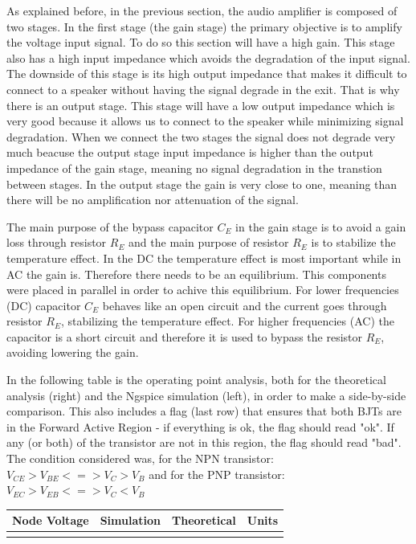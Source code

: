 As explained before, in the previous section, the audio amplifier is composed of two stages. In the first stage (the gain stage) the primary objective is to amplify the voltage input signal. To do so this section will have a high gain. This stage also has a high input impedance which avoids the degradation of the input signal. The  downside of this stage is its high output impedance that makes it difficult to connect to a speaker without having the signal degrade in the exit. That is why there is an output stage. This stage will have a low output impedance which is very good because it allows us to connect to the speaker while minimizing signal degradation. When we connect the two stages the signal does not degrade very much beacuse the output stage input impedance is higher than the output impedance of the gain stage, meaning no signal degradation in the transtion between stages. In the output stage the gain is very close to one, meaning than there will be no amplification nor attenuation of the signal.   

The main purpose of the bypass capacitor $C_{E}$ in the gain stage is to avoid a gain loss through resistor ${R_E}$ and the main purpose of resistor ${R_E}$ is to stabilize the temperature effect. In the DC the temperature effect is most important while in AC the gain is. Therefore there needs to be an equilibrium. This components were placed in parallel in order to achive this equilibrium. For lower frequencies (DC) capacitor $C_{E}$ behaves like an open circuit and the current goes through resistor ${R_E}$, stabilizing the temperature effect. For higher frequencies (AC) the capacitor is a short circuit and therefore it is used to bypass the resistor $R_{E}$, avoiding lowering the gain. 

In the following table is the operating point analysis, both for the theoretical analysis (right) and the Ngspice simulation (left), in order to make a side-by-side comparison. This also includes a flag (last row) that ensures that both BJTs are in the Forward Active Region - if everything is ok, the flag should read "ok". If any (or both) of the transistor are not in this region, the flag should read "bad". The condition considered was, for the NPN transistor: $V_{CE} > V_{BE} <=> V_{C} > V_{B}$ and for the PNP transistor: $V_{EC} > V_{EB} <=> V_{C} < V_{B}$

\hfill
 \parbox{1\linewidth}{
  \centering
  \begin{tabular}{|l|l|l|r|}
    \hline    
    {\bf Node Voltage} & {\bf Simulation} & {\bf Theoretical } & {\bf Units }\\ \hline
    
  \label{tab:op_FAR}
  \end{tabular}
  }

